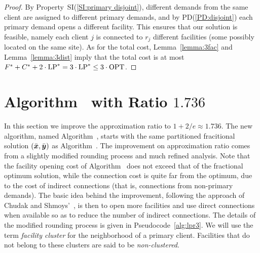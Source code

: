 \documentclass[11pt]{article}
\begin{document}
\begin{proof}
  By Property~SI(\ref{SI:primary disjoint}), different
  demands from the same client are assigned to different
  primary demands, and by PD(\ref{PD:disjoint}) each primary
  demand opens a different facility. This ensures that our
  solution is feasible, namely each client $j$ is connected
  to $r_j$ different facilities (some possibly located on
  the same site).  As for the total cost,
  Lemma~\ref{lemma:3fac} and Lemma~\ref{lemma:3dist} imply
  that the total cost is at most
  $F^\ast+C^\ast+2\cdot\mbox{\rm LP}^\ast = 3\cdot\mbox{\rm LP}^\ast \leq
  3\cdot\mbox{\rm OPT}$.
\end{proof}




\section{Algorithm~{\ECHU} with Ratio $1.736$}\label{sec: 1.736-approximation}

In this section we improve the approximation ratio to $1+2/e
\approx 1.736$. The new algorithm, named Algorithm~{\ECHU},
starts with the same partitioned fracitional solution
$(\bar{\boldsymbol{x}}, \bar{\boldsymbol{y}})$ as Algorithm~{\EGUP}. The improvement
on approximation ratio comes from a slightly modified
rounding process and much refined analysis.  Note that the
facility opening cost of Algorithm~{\EGUP} does not exceed
that of the fractional optimum solution, while the
connection cost is quite far from the optimum, due to the
cost of indirect connections (that is, connections from
non-primary demands).  The basic idea behind the
improvement, following the approach of Chudak and
Shmoys'~\cite{ChudakS04}, is then to open more facilities
and use direct connections when available so as to reduce
the number of indirect connections. The details of the
modified rounding process is given in
Pseudocode~\ref{alg:lpr3}.  We will use the term
\emph{facility cluster} for the neighborhood of a primary
client. Facilities that do not belong to these clusters are
said to be \emph{non-clustered}.
\end{document}
